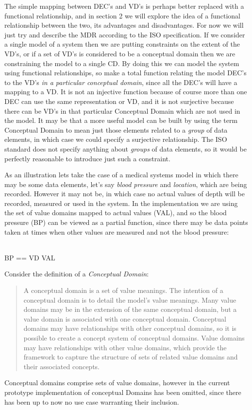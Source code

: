 The simple mapping between DEC's and VD's is perhaps better replaced with a functional relationship, and in section 2 we will explore the idea of a functional relationship between the two, its advantages and disadvantages. For now we will just try and describe the MDR according to the ISO specification. If we consider a single model of a system then we are putting constraints on the extent of the VD's, or if a set of VD's is considered to be a conceptual domain then we are constraining the model to a single CD.  By doing this we can model the system using functional relationships, so make a total function relating the model DEC's to the VD's \emph{in a particular conceptual domain}, since all the DEC's will have a mapping to a VD. It is not an injective function because of course more than one DEC can use the same representation or VD, and it is not surjective because there can be VD's in that particular Conceptual Domain which are not used in the model. It may be that a more useful model can be built by using the term Conceptual Domain to mean just those elements related to a \emph{group} of data elements, in which case we could specify a surjective relationship.  The ISO standard does not specify anything about \emph{groups} of data elements, so it would be perfectly reasonable to introduce just such a constraint. 


As an illustration lets take the case of a medical systems model in which there may be some data elements, let's say \emph{blood pressure} and \emph{location}, which are being recorded.  However it may not be, in which case no actual values of depth will be recorded, measured or used in the system. In the implementation we are using the set of value domains mapped to actual values (VAL), and so the blood pressure (BP) can be viewed as a partial function, since there may be data points taken at times when other values are measured and not the blood pressure:
\begin{zed}
	[VAL]\\
	BP == VD \pfun VAL
\end{zed}
 
 

Consider the definition of a \emph{Conceptual Domain}:
\begin{quote}
	A conceptual domain is a set of value meanings. The intention of a conceptual domain is to detail the model's value meanings. Many value domains may be in the extension of the same conceptual domain, but a value domain is associated with one conceptual domain. Conceptual domains may have relationships with other conceptual domains, so it is possible to create a concept system of conceptual domains. Value domains may have relationships with other value domains, which provide the framework to capture the structure of sets of related value domains and their associated concepts.	
\end{quote}
Conceptual domains comprise sets of value domains, however in the current prototype implementation of conceptual Domains has been omitted, since there has been up to now no use case warranting their inclusion.

